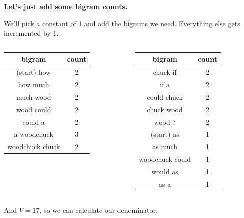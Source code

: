\documentclass{beamer}
\newcommand{\pagestepalt}[2]{
  \begin{frame}[t]
    \begin{minipage}[t][0.26\textheight][t]{\textwidth}
      \begin{center}
        \huge
        \textbf{#1}
      \end{center}
    \end{minipage}
    
    \begin{minipage}[t][0.7\textheight][t]{\textwidth}
      #2
    \end{minipage}
  \end{frame}
}
\begin{document}
\pagestepalt{Let's just add some bigram counts.}{
  We'll pick a constant of 1 and add the bigrams we need. Everything
  else gets incremented by 1.
  \vspace{-0.75cm}
  \begin{columns}[T]
      \begin{column}{0.5\textwidth}
        \begin{center}
          \small
          \begin{tabular}{c|c}
            bigram & count \\
            \hline
            (start) how & \alert{2} \\
            how much & \alert{2} \\
            much wood & \alert{2} \\
            wood could & \alert{2} \\
            could a & \alert{2} \\
            a woodchuck & \alert{3} \\
            woodchuck chuck & \alert{2} \\
          \end{tabular}
        \end{center}
      \end{column}
      \begin{column}{0.5\textwidth}
        \begin{center}
          \small
          \begin{tabular}{c|c}
            bigram & count \\
            \hline
            chuck if & \alert{2}\\
            if a & \alert{2} \\
            could chuck & \alert{2} \\
            chuck wood & \alert{2} \\
            wood ? & \alert{2} \\
            \alert{(start) as} & 1\\
            \alert{as much} & 1 \\
            \alert{woodchuck could} & 1 \\
            \alert{would as} & 1 \\
            \alert{as a} & 1 \\
          \end{tabular}
        \end{center}
      \end{column}
  \end{columns} 

  \vspace{0.1cm}
  And $V = 17$, so we can calculate our denominator.
}
\end{document}
